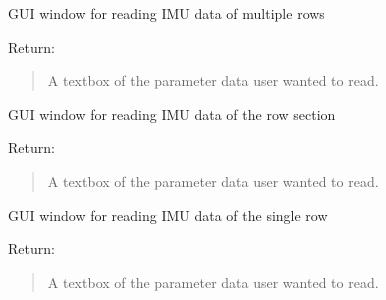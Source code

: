 \documentclass[letterpaper,10pt,english]{sphinxmanual}
\begin{document}

\begin{fulllineitems}
\label{\detokenize{Library GUI:library_gui.imu_multiple_row}}
GUI window for reading IMU data of multiple rows

Return:
\begin{quote}

A textbox of the parameter data user wanted to read.
\end{quote}

\end{fulllineitems}


\begin{fulllineitems}
\label{\detokenize{Library GUI:library_gui.imu_row_section}}
GUI window for reading IMU data of the row section

Return:
\begin{quote}

A textbox of the parameter data user wanted to read.
\end{quote}

\end{fulllineitems}


\begin{fulllineitems}
\label{\detokenize{Library GUI:library_gui.imu_single_row}}
GUI window for reading IMU data of the single row

Return:
\begin{quote}

A textbox of the parameter data user wanted to read.
\end{quote}

\end{fulllineitems}

\end{document}
